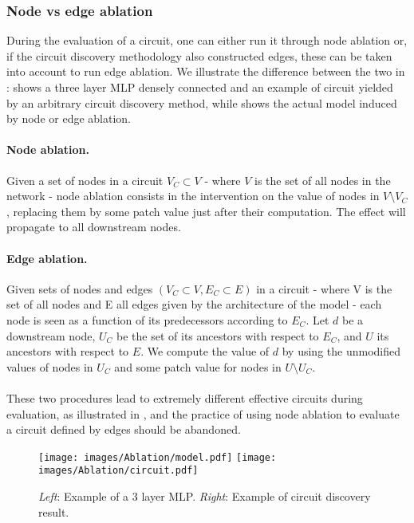 \documentclass{article}
\begin{document}
\subsubsection{Node vs edge ablation}
\label{sec:node_edge_ablation}

During the evaluation of a circuit, one can either run it through node ablation or, if the circuit discovery methodology also constructed edges, these can be taken into account to run edge ablation. We illustrate the difference between the two in :  shows a three layer MLP densely connected and an example of circuit yielded by an arbitrary circuit discovery method, while  shows the actual model induced by node or edge ablation.

\paragraph{Node ablation.} Given a set of nodes in a circuit $V_C \subset V$ - where $V$ is the set of all nodes in the network - node ablation consists in the intervention on the value of nodes in $V \setminus V_C$, replacing them by some patch value just after their computation. The effect will propagate to all downstream nodes.

\paragraph{Edge ablation.} Given sets of nodes and edges $(V_C \subset V, E_C \subset E)$ in a circuit - where V is the set of all nodes and E all edges given by the architecture of the model - each node is seen as a function of its predecessors according to $E_C$. Let $d$ be a downstream node, $U_C$ be the set of its ancestors with respect to $E_C$, and $U$ its ancestors with respect to $E$. We compute the value of $d$ by using the unmodified values of nodes in $U_C$ and some patch value for nodes in $U \setminus U_C$.

\paragraph{}These two procedures lead to extremely different effective circuits during evaluation, as illustrated in , and the practice of using node ablation to evaluate a circuit defined by edges should be abandoned.

\begin{figure}[ht]
    \centering
    \texttt{[image: images/Ablation/model.pdf]}
    \texttt{[image: images/Ablation/circuit.pdf]}
    \caption{\textit{Left}: Example of a 3 layer MLP. \textit{Right}: Example of circuit discovery result.}
    \label{fig:example_model}
\end{figure}
\end{document}
